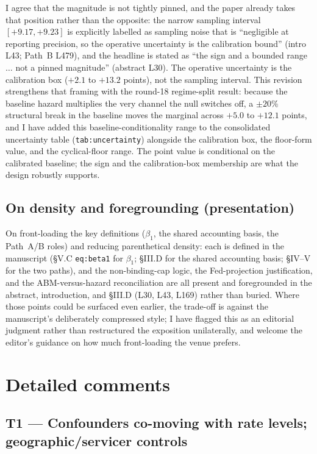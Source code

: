 \documentclass[11pt]{article}
\newcommand{\mlabel}[1]{\texttt{#1}}
\begin{document}
I agree that the magnitude is not tightly pinned, and the paper already takes
that position rather than the opposite: the narrow sampling interval
$[+9.17, +9.23]$ is explicitly labelled as sampling noise that is ``negligible
at reporting precision, so the operative uncertainty is the calibration bound''
(intro L43; Path~B L479), and the headline is stated as ``the sign and a
bounded range $\ldots$ not a pinned magnitude'' (abstract L30). The operative
uncertainty is the calibration box ($+2.1$ to $+13.2$ points), not the sampling
interval. This revision strengthens that framing with the round-18
regime-split result: because the baseline hazard multiplies the very channel
the null switches off, a $\pm 20\%$ structural break in the baseline moves the
marginal across $+5.0$ to $+12.1$ points, and I have added this
baseline-conditionality range to the consolidated uncertainty table
(\mlabel{tab:uncertainty}) alongside the calibration box, the floor-form value,
and the cyclical-floor range. The point value is conditional on the calibrated
baseline; the sign and the calibration-box membership are what the design
robustly supports.

\subsection*{On density and foregrounding (presentation)}

On front-loading the key definitions ($\beta_1$, the shared accounting basis,
the Path~A/B roles) and reducing parenthetical density: each is defined in the
manuscript (\S V.C \mlabel{eq:beta1} for $\beta_1$; \S III.D for the shared
accounting basis; \S IV--V for the two paths), and the non-binding-cap logic,
the Fed-projection justification, and the ABM-versus-hazard reconciliation are
all present and foregrounded in the abstract, introduction, and \S III.D
(L30, L43, L169) rather than buried. Where those points could be surfaced even
earlier, the trade-off is against the manuscript's deliberately compressed
style; I have flagged this as an editorial judgment rather than restructured the
exposition unilaterally, and welcome the editor's guidance on how much
front-loading the venue prefers.

\section*{Detailed comments}

\subsection*{T1 --- Confounders co-moving with rate levels; geographic/servicer controls}
\end{document}
